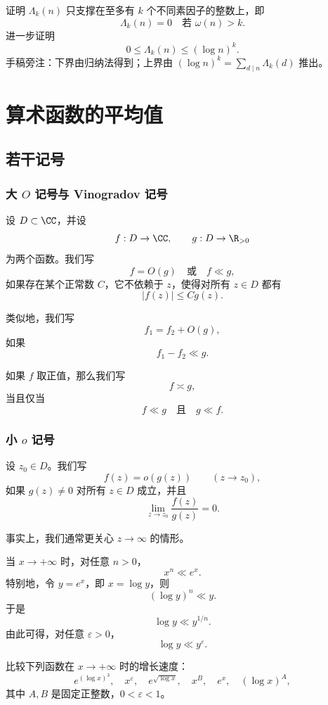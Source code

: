 \begin{exercise}
	证明 $\Lambda_k(n)$ 只支撑在至多有 $k$ 个不同素因子的整数上，即
	\[
		\Lambda_k(n)=0
		\quad \text{若 } \omega(n)>k.
	\]
	进一步证明
	\[
		0\leq \Lambda_k(n)\leq (\log n)^k.
	\]
	手稿旁注：下界由归纳法得到；上界由 $(\log n)^k=\sum_{d\mid n}\Lambda_k(d)$ 推出。
\end{exercise}

\chapter{算术函数的平均值}


\section{若干记号}

\subsection{大 $O$ 记号与 Vinogradov 记号}

设 $D\subset \CC$，并设
\[
	f:D\to\CC,\qquad g:D\to \R_{>0}
\]
为两个函数。我们写
\[
	f=O(g)
	\quad\text{或}\quad
	f\ll g,
\]
如果存在某个正常数 $C$，它不依赖于 $z$，使得对所有 $z\in D$ 都有
\[
	|f(z)|\leq Cg(z).
\]

类似地，我们写
\[
	f_1=f_2+O(g),
\]
如果
\[
	f_1-f_2\ll g.
\]

如果 $f$ 取正值，那么我们写
\[
	f\asymp g,
\]
当且仅当
\[
	f\ll g
	\quad\text{且}\quad
	g\ll f.
\]

\subsection{小 $o$ 记号}

设 $z_0\in D$。我们写
\[
	f(z)=o(g(z))\qquad (z\to z_0),
\]
如果 $g(z)\neq 0$ 对所有 $z\in D$ 成立，并且
\[
	\lim_{z\to z_0}\frac{f(z)}{g(z)}=0.
\]

事实上，我们通常更关心 $z\to\infty$ 的情形。

\begin{example}
	当 $x\to+\infty$ 时，对任意 $n>0$，
	\[
		x^n\ll e^x.
	\]
	特别地，令 $y=e^x$，即 $x=\log y$，则
	\[
		(\log y)^n\ll y.
	\]
	于是
	\[
		\log y\ll y^{1/n}.
	\]
	由此可得，对任意 $\varepsilon>0$，
	\[
		\log y\ll y^\varepsilon.
	\]
\end{example}

\begin{exercise}
	比较下列函数在 $x\to+\infty$ 时的增长速度：
	\[
		e^{(\log x)^3},\quad
		x^\varepsilon,\quad
		e^{\sqrt{\log x}},\quad
		x^B,\quad
		e^x,\quad
		(\log x)^A,
	\]
	其中 $A,B$ 是固定正整数，$0<\varepsilon<1$。
\end{exercise}


